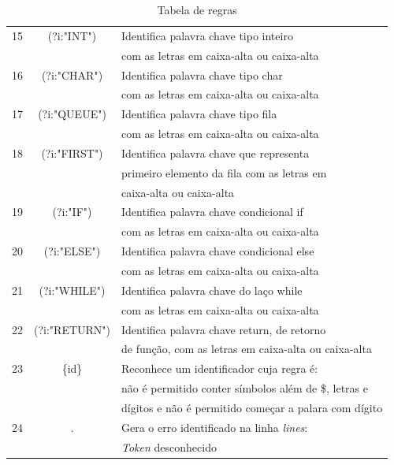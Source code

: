 \documentclass[12pt]{article}
\begin{document}
\begin{table}
\begin{tabular}{|c || c  l |}
 \hline
 15 & (?i:"INT")& Identifica palavra chave tipo inteiro \\&& com as letras em caixa-alta ou caixa-alta \\
 \hline
 16 & (?i:"CHAR") & Identifica palavra chave tipo char \\&& com as letras em caixa-alta ou caixa-alta \\
 \hline
 17 & (?i:"QUEUE")& Identifica palavra chave tipo fila \\&& com as letras em caixa-alta ou caixa-alta \\
 \hline
 18 & (?i:"FIRST")& Identifica palavra chave que representa \\&&  primeiro elemento da fila com as letras em \\&& caixa-alta ou caixa-alta  \\
 \hline
 19 & (?i:"IF")& Identifica palavra chave condicional if \\&& com as letras em caixa-alta ou caixa-alta \\
 \hline
 20 & (?i:"ELSE")& Identifica palavra chave condicional else \\&& com as letras em caixa-alta ou caixa-alta \\
 \hline
 21 & (?i:"WHILE")& Identifica palavra chave do laço while \\&& com as letras em caixa-alta ou caixa-alta \\
 \hline
 22 & (?i:"RETURN")& Identifica palavra chave return, de retorno \\&& de função, com as letras em caixa-alta ou caixa-alta \\
 \hline
 23 & \{id\} & Reconhece um identificador cuja regra é: \\&& não é permitido conter símbolos além de \$, letras e \\&& dígitos e não é permitido começar a palara com dígito \\
 \hline
 24 & . & {\color{red}Gera o erro identificado na linha \textit{lines}:} \\&& {\color{red}\textit{Token} desconhecido} \\
 \hline
\end{tabular}
\caption{Tabela de regras}
\label{TabelaRegras}
\end{table}

\end{document}
